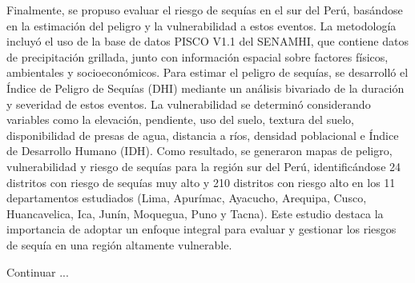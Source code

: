 Finalmente, \textcite{Vega2016} se propuso evaluar el riesgo de sequías en el sur del Perú, basándose en la estimación del peligro y la vulnerabilidad a estos eventos. La metodología incluyó el uso de la base de datos PISCO V1.1 del SENAMHI, que contiene datos de precipitación grillada, junto con información espacial sobre factores físicos, ambientales y socioeconómicos. Para estimar el peligro de sequías, se desarrolló el Índice de Peligro de Sequías (DHI) mediante un análisis bivariado de la duración y severidad de estos eventos. La vulnerabilidad se determinó considerando variables como la elevación, pendiente, uso del suelo, textura del suelo, disponibilidad de presas de agua, distancia a ríos, densidad poblacional e Índice de Desarrollo Humano (IDH). Como resultado, se generaron mapas de peligro, vulnerabilidad y riesgo de sequías para la región sur del Perú, identificándose 24 distritos con riesgo de sequías muy alto y 210 distritos con riesgo alto en los 11 departamentos estudiados (Lima, Apurímac, Ayacucho, Arequipa, Cusco, Huancavelica, Ica, Junín, Moquegua, Puno y Tacna). Este estudio destaca la importancia de adoptar un enfoque integral para evaluar y gestionar los riesgos de sequía en una región altamente vulnerable.

Continuar ...

